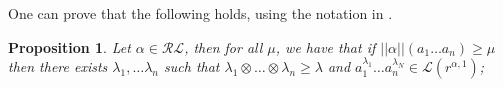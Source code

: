 \documentclass{article}
\def\ie{{\em i.e. }}
\newtheorem{proposition}{Proposition}[section]
\begin{document}
One can prove that the following holds, using the notation in \cite{SC12}.
\begin{proposition} Let $\alpha \in \mathcal R \mathcal L$, then for all $\mu$, we have that if  $||\alpha ||(a_1\ldots a_n)\geq \mu$  then there exists $\lambda_1,\ldots \lambda_n$ such that  $\lambda_1\otimes  \ldots \otimes \lambda_n\geq \lambda$ and $a_1^{\lambda_1}\ldots a_n^{\lambda_N}\in \mathcal L(r^{\alpha,1})$;
\end{proposition}




















\end{document}
